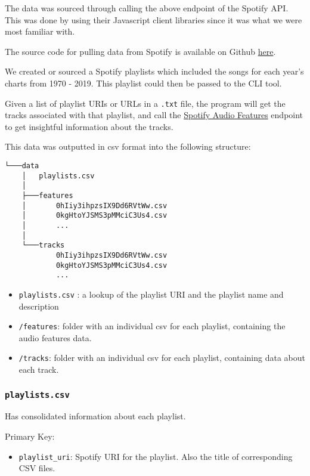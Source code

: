 \documentclass[
]{article}
\providecommand{\tightlist}{%
  \setlength{\itemsep}{0pt}\setlength{\parskip}{0pt}}
\begin{document}
The data was sourced through calling the above endpoint of the Spotify
API. This was done by using their Javascript client libraries since it
was what we were most familiar with.

The source code for pulling data from Spotify is available on Github
\href{https://github.com/kvithana/spotify-audio-features-to-csv}{here}.

We created or sourced a Spotify playlists which included the songs for
each year's charts from 1970 - 2019. This playlist could then be passed
to the CLI tool.

Given a list of playlist URIs or URLs in a \texttt{.txt} file, the
program will get the tracks associated with that playlist, and call the
\href{https://developer.spotify.com/documentation/web-api/reference/tracks/get-audio-features/}{Spotify
Audio Features} endpoint to get insightful information about the tracks.

This data was outputted in csv format into the following structure:

\begin{verbatim}
└───data
    │   playlists.csv
    │
    ├───features
    │       0hIiy3ihpzsIX9Dd6RVtWw.csv
    │       0kgHtoYJSMS3pMMciC3Us4.csv
    │       ...
    │
    └───tracks
            0hIiy3ihpzsIX9Dd6RVtWw.csv
            0kgHtoYJSMS3pMMciC3Us4.csv
            ...
\end{verbatim}

\begin{itemize}
\tightlist
\item
  \texttt{playlists.csv} : a lookup of the playlist URI and the playlist
  name and description
\item
  \texttt{/features}: folder with an individual csv for each playlist,
  containing the audio features data.
\item
  \texttt{/tracks}: folder with an individual csv for each playlist,
  containing data about each track.
\end{itemize}

\hypertarget{playlists.csv}{%
\subsubsection{\texorpdfstring{\texttt{playlists.csv}}{playlists.csv}}\label{playlists.csv}}

Has consolidated information about each playlist.

Primary Key:

\begin{itemize}
\tightlist
\item
  \texttt{playlist\_uri}: Spotify URI for the playlist. Also the title
  of corresponding CSV files.
\end{itemize}
\end{document}
